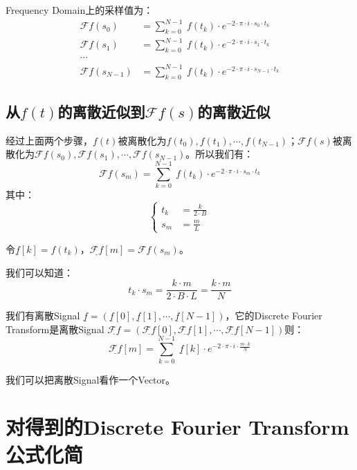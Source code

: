 Frequency Domain上的采样值为：
\begin{align*}
	\mathcal{F}f(s_0)     & =\sum\limits_{k=0}^{N-1}\ f(t_k)\cdot e^{-2\cdot \pi\cdot i\cdot s_0\cdot t_k}     \\
	\mathcal{F}f(s_1)     & =\sum\limits_{k=0}^{N-1}\ f(t_k)\cdot e^{-2\cdot \pi\cdot i\cdot s_1\cdot t_k}     \\
	\cdots                                                                                                     \\
	\mathcal{F}f(s_{N-1}) & =\sum\limits_{k=0}^{N-1}\ f(t_k)\cdot e^{-2\cdot \pi\cdot i\cdot s_{N-1}\cdot t_k}
\end{align*}
\subsection{从$f(t)$的离散近似到$\mathcal{F}f(s)$的离散近似}
经过上面两个步骤，$f(t)$被离散化为$f(t_0),f(t_1),\cdots,f(t_{N-1})$；$\mathcal{F}f(s)$被离散化为$\mathcal{F}f(s_0),\mathcal{F}f(s_1),\cdots,\mathcal{F}f(s_{N-1})$。所以我们有：
$$
	\mathcal{F}f(s_m)=\sum\limits_{k=0}^{N-1}\ f(t_k)\cdot e^{-2\cdot \pi\cdot i\cdot s_m\cdot t_k}
$$
其中：
$$
	\begin{cases}
		t_k & = \frac{k}{2\cdot B} \\
		s_m & = \frac{m}{L}
	\end{cases}
$$

令$\underline{f}[k]=f(t_k)$，$\underline{\mathcal{F}f}[m]=\mathcal{F}f(s_m)$。

我们可以知道：
$$
	t_k\cdot s_m=\frac{k\cdot m}{2\cdot B\cdot L}=\frac{k\cdot m}{N}
$$

我们有离散Signal $\underline{f}=(\underline{f}[0],\underline{f}[1],\cdots,\underline{f}[N-1])$，它的Discrete Fourier Transform是离散Signal $\underline{\mathcal{F}f}=(\underline{\mathcal{F}f}[0],\underline{\mathcal{F}f}[1],\cdots,\underline{\mathcal{F}f}[N-1])$则：
\begin{equation}
	\underline{\mathcal{F}f}[m]=\sum\limits_{k=0}^{N-1}\ \underline{f}[k]\cdot e^{-2\cdot \pi\cdot i\cdot \frac{m\cdot k}{N}}
\end{equation}

我们可以把离散Signal看作一个Vector。
\section{对得到的Discrete Fourier Transform公式化简}
